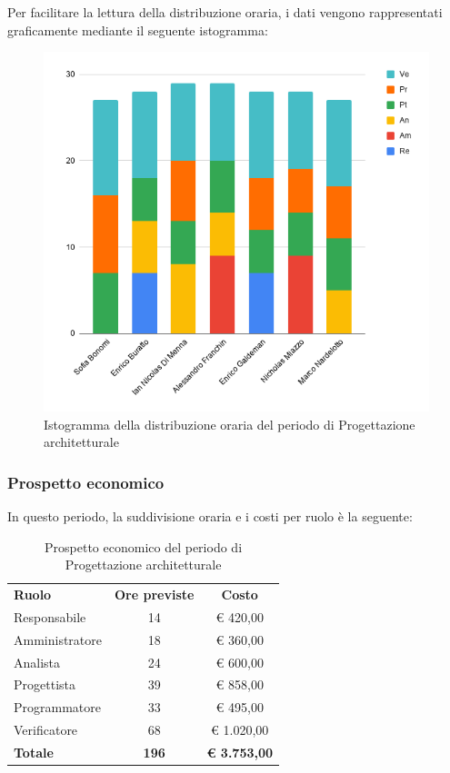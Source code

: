 \documentclass[../piano-di-progetto.tex]{subfiles}
\begin{document}
  Per facilitare la lettura della distribuzione oraria, i dati vengono rappresentati graficamente mediante il seguente istogramma:
  \begin{figure}[H]
    \centering
    \includegraphics[width=12cm]{img/ore-progettazione.png}
    \caption{Istogramma della distribuzione oraria del periodo di Progettazione architetturale}
    \label{fig:ore-componente-progettazione}
  \end{figure}

  \subsubsection{Prospetto economico}
  In questo periodo, la suddivisione oraria e i costi per ruolo è la seguente:

  \begin{table}[H]
    \centering
    \begin{tabular}{lcc}
      \rowcolor{lightgray}
      \textbf{Ruolo}  & \textbf{Ore previste} & \textbf{Costo}  \\
      Responsabile    & 14           & € 420,00            \\
      Amministratore  & 18           & € 360,00            \\
      Analista        & 24           & € 600,00            \\
      Progettista     & 39           & € 858,00            \\
      Programmatore   & 33           & € 495,00            \\
      Verificatore    & 68           & € 1.020,00          \\
      \textbf{Totale} & \textbf{196} & \textbf{€ 3.753,00}
    \end{tabular}
    \caption{Prospetto economico del periodo di Progettazione architetturale}
  \end{table}
\end{document}
